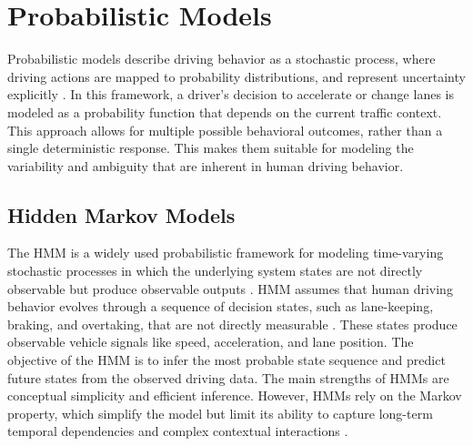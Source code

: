 \section{Probabilistic Models}
Probabilistic models describe driving behavior as a stochastic process, where driving actions are mapped
to probability distributions, and represent uncertainty explicitly \cite{wang2023probabilisticpredictionlongitudinaltrajectory}. 
In this framework, a driver’s decision to
accelerate or change lanes is modeled as a probability function that depends on the current traffic context.
This approach allows for multiple possible behavioral outcomes, rather than a single deterministic response.
This makes them suitable for modeling the variability and ambiguity that are inherent in human driving behavior.

\subsection{Hidden Markov Models}
The \ac{HMM} is a widely used probabilistic framework for modeling time-varying
stochastic processes in which the underlying system states are not directly observable but produce observable
outputs \cite{rabiner1989tutorial}. \ac{HMM} assumes that human driving behavior evolves through a sequence of decision states,
such as lane-keeping, braking, and overtaking, that are not directly measurable \cite{8500717}. These states produce
observable vehicle signals like speed, acceleration, and lane position. The objective of the \ac{HMM} is to infer
the most probable state sequence and predict future states from the observed driving data. The main
strengths of \acp{HMM} are conceptual simplicity and efficient inference. However, \acp{HMM} rely on the Markov
property, which simplify the model but limit its ability to capture long-term temporal dependencies and
complex contextual interactions \cite{chen2023datadriventrafficsimulationcomprehensive}.

